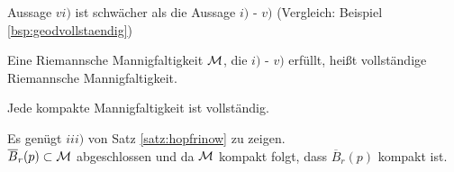 \begin{bem}
Aussage $vi)$ ist schwächer als die Aussage $i)$ - $v)$ 
(Vergleich: Beispiel \ref{bsp:geodvollstaendig}) 
\end{bem}


\begin{defs}
    Eine Riemannsche Mannigfaltigkeit $\mathcal{M}$, die  $i)$ - $v)$ erfüllt, 
    heißt vollständige Riemannsche Mannigfaltigkeit.
\end{defs}

\begin{kor}
    \label{kor:kompaktvoll}
    Jede kompakte Mannigfaltigkeit ist vollständig.
\end{kor}
\begin{bew}
Es genügt $iii)$ von Satz \ref{satz:hopfrinow} zu zeigen.\\
$\overline{B}_r(p) \subset \mathcal{M}$ abgeschlossen und da $\mathcal{M}$ kompakt folgt, 
dass $\overline{B}_r (p)$ kompakt ist.    
\end{bew}


